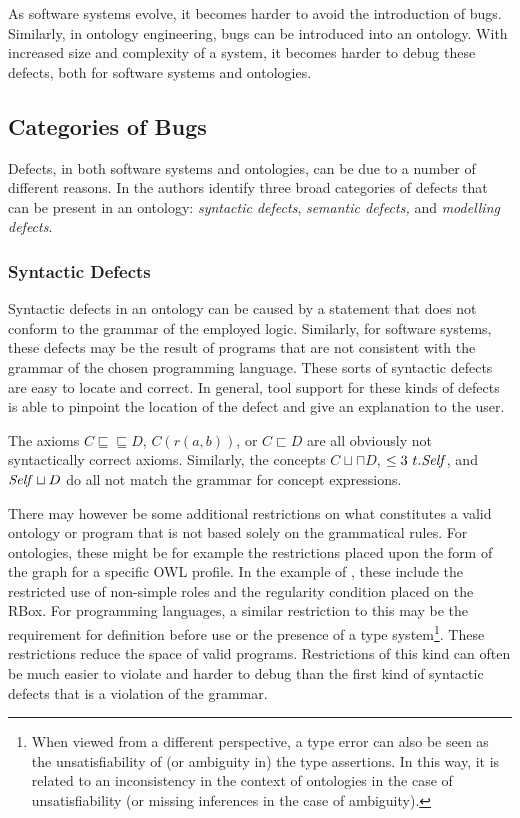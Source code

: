 
As software systems evolve, it becomes harder to avoid the introduction of bugs. Similarly, in ontology engineering, bugs can be introduced into an ontology. With increased size and complexity of a system, it becomes harder to debug these defects, both for software systems and ontologies.

\subsection{Categories of Bugs} \label{categories-of-bugs}

Defects, in both software systems and ontologies, can be due to a number of different reasons. In \cite{kalyanpur2005debugging} the authors identify three broad categories of defects that can be present in an ontology: \emph{syntactic defects}, \emph{semantic defects,} and \emph{modelling defects}.

\subsubsection{Syntactic Defects} \label{syntactic-defects}

Syntactic defects in an ontology can be caused by a statement that does not conform to the grammar of the employed logic. Similarly, for software systems, these defects may be the result of programs that are not consistent with the grammar of the chosen programming language. These sorts of syntactic defects are easy to locate and correct. In general, tool support for these kinds of defects is able to pinpoint the location of the defect and give an explanation to the user.

\begin{example}
  The axioms $C \sqsubseteq \sqsubseteq D$, $C(r(a, b))$, or $C \sqsubset D$ are all obviously not syntactically correct \SROIQ axioms. Similarly, the concepts $C \sqcup \sqcap D$, $\leq 3~t.\mathit{Self}$, and $\mathit{Self} \sqcup D$ do all not match the grammar for concept expressions.
\end{example}

There may however be some additional restrictions on what constitutes a valid ontology or program that is not based solely on the grammatical rules. For ontologies, these might be for example the restrictions placed upon the form of the graph for a specific OWL profile. In the example of \SROIQ, these include the restricted use of non-simple roles and the regularity condition placed on the RBox. For programming languages, a similar restriction to this may be the requirement for definition before use or the presence of a type system\footnote{When viewed from a different perspective, a type error can also be seen as the unsatisfiability of (or ambiguity in) the type assertions. In this way, it is related to an inconsistency in the context of ontologies in the case of unsatisfiability (or missing inferences in the case of ambiguity).}. These restrictions reduce the space of valid programs. Restrictions of this kind can often be much easier to violate and harder to debug than the first kind of syntactic defects that is a violation of the grammar.

